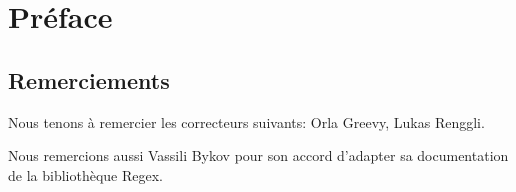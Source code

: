 \documentclass[a4paper,10pt,twoside]{book}
\begin{document}
	\sloppy
	\frontmatter
\fi
\chapter{Préface}


\section*{Remerciements}






Nous tenons à remercier les correcteurs suivants: 
Orla Greevy,
Lukas Renggli.

Nous remercions aussi 
Vassili Bykov 
pour son accord d'adapter sa documentation de la bibliothèque Regex.

\ifx\wholebook\relax\else
   
   
\end{document}
